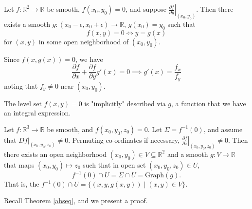 \begin{example}
    Let \(f: \mathbb{R}^2 \to \mathbb{R}\) be smooth, \(f(x_0, y_0) = 0\), and suppose \(\left.\frac{\partial f}{\partial y}\right|_{(x_0, y_0)}\). Then there exists a smooth \(g: (x_0 - \epsilon, x_0 + \epsilon)\to \mathbb{R}\), \(g(x_0)=y_0\) such that
    \[
        f(x,y) = 0 \iff y = g(x)
    \]
    for \((x,y)\) in some open neighborhood of \((x_0, y_0)\).

    Since \(f(x, g(x)) = 0\), we have
    \[
        \frac{\partial f}{\partial x} + \frac{\partial f}{\partial y} g'(x) = 0 \implies g'(x) = \frac{f_x}{f_y}
    \]
    noting that \(f_y \neq 0\) near \((x_0, y_0)\).

    The level set \(f(x,y) = 0\) is "implicitly" described via \(g\), a function that we have an integral expression.
\end{example}
\begin{example}
    Let \(f: \mathbb{R}^3 \to \mathbb{R}\) be smooth, and \(f(x_0, y_0, z_0) = 0\). Let \(\Sigma = f^{-1}(0)\), and assume that \(\left. Df\right|_{(x_0, y_0,z_0)} \neq 0\). Permuting co-ordinates if necessary, \(\left.\frac{\partial f}{\partial z} \right|_{(x_0,y_0,z_0)} \neq 0\). Then there exists an open neighborhood \((x_0, y_0) \in V \subseteq \mathbb{R}^2\) and a smooth \(g: V \to \mathbb{R}\) that maps \((x_0, y_0) \mapsto z_0\) such that in open set \((x_0, y_0, z_0) \in U\),
    \[
        f^{-1}(0)\cap U = \Sigma\cap U = \mathrm{Graph}(g).
    \]
    That is, the \(f^{-1}(0)\cap U = \{(x,y,g(x,y))\mid (x,y)\in V\}\).
\end{example}
Recall Theorem \eqref{abseq}, and we present a proof.
